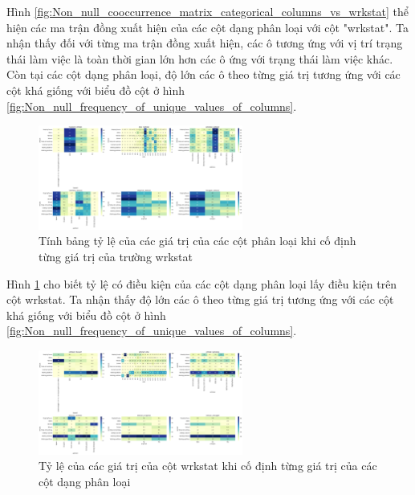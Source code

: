 Hình \ref{fig:Non_null_cooccurrence_matrix_categorical_columns_vs_wrkstat} thể hiện các ma trận đồng xuất hiện của các cột dạng phân loại với cột "wrkstat".
Ta nhận thấy đối với từng ma trận đồng xuất hiện, các ô tương ứng với vị trí trạng thái làm việc là toàn thời gian lớn hơn các ô ứng với trạng thái làm việc khác.
Còn tại các cột dạng phân loại, độ lớn các ô theo từng giá trị tương ứng với các cột khá giống với biểu đồ cột ở hình \ref{fig:Non_null_frequency_of_unique_values_of_columns}.

\begin{figure}[H]
    \centering
    \includegraphics[width=0.6\textwidth]{figures/Thanh/Data_Analysis/Non_null_percentage_matrix_categorical_columns_condition_on_wrkstat.png}
    \caption{Tính bảng tỷ lệ của các giá trị của các cột phân loại khi cố định từng giá trị của trường wrkstat}
    \label{fig:Non_null_percentage_matrix_categorical_columns_condition_on_wrkstat}
\end{figure}

Hình \ref{fig:Non_null_percentage_matrix_categorical_columns_condition_on_wrkstat} cho biết tỷ lệ có điều kiện của các cột dạng phân loại lấy điều kiện trên cột wrkstat.
Ta nhận thấy độ lớn các ô theo từng giá trị tương ứng với các cột khá giống với biểu đồ cột ở hình \ref{fig:Non_null_frequency_of_unique_values_of_columns}.

\begin{figure}[H]
    \centering
    \includegraphics[width=0.6\textwidth]{figures/Thanh/Data_Analysis/Non_null_percentage_matrix_categorical_wrkstat_condition_on_columns.png}
    \caption{Tỷ lệ của các giá trị của cột wrkstat khi cố định từng giá trị của các cột dạng phân loại}
    \label{fig:Non_null_percentage_matrix_categorical_wrkstat_condition_on_columns}
\end{figure}

